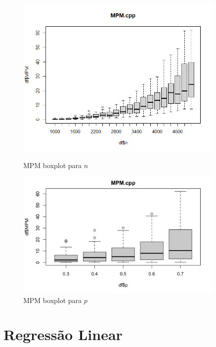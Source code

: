 \documentclass{uofa-eng-assignment}
\begin{document}
\begin{figure}[h]
    \begin{minipage}{0.45\textwidth}
        \centering
        \includegraphics[width=0.9\textwidth]{mpm-n.png}
        \caption{MPM boxplot para $n$}
        \label{fig:boxplot-mpm-n}
    \end{minipage}
    \hfill
    \begin{minipage}{0.45\textwidth}
        \centering
        \includegraphics[width=0.9\textwidth]{mpm-p.png}
        \caption{MPM boxplot para $p$}
        \label{fig:boxplot-mpm-p}
    \end{minipage}
\end{figure}






\newpage\clearpage
\section{Regressão Linear}
\end{document}
